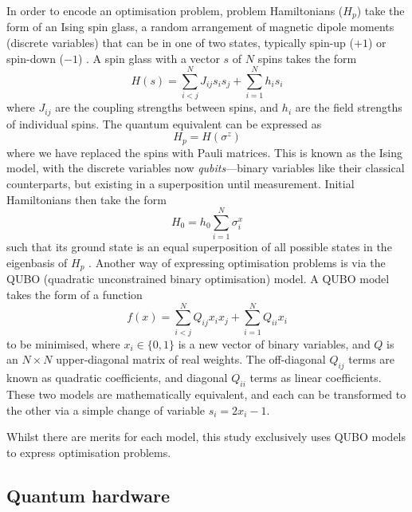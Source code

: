 \documentclass[twocolumn]{article}
\theoremstyle{definition}
\begin{document}
In order to encode an optimisation problem, problem Hamiltonians ($H_p$) take the form of an Ising spin glass, a random arrangement of magnetic dipole moments (discrete variables) that can be in one of two states, typically spin-up ($+1$) or spin-down ($-1$) \cite{lucas_ising_2014}. A spin glass with a vector $s$ of $N$ spins takes the form
\begin{equation}
    H(s) = \sum_{i<j}^{N}J_{ij}s_i s_j + \sum_{i=1}^{N}h_i s_i
    \label{eq:ising}
\end{equation}
where $J_{ij}$ are the coupling strengths between spins, and $h_i$ are the field strengths of individual spins. The quantum equivalent can be expressed as
\begin{equation}
    H_p = H(\sigma^z)
\end{equation}
where we have replaced the spins with Pauli matrices. This is known as the Ising model, with the discrete variables now \emph{qubits}---binary variables like their classical counterparts, but existing in a superposition until measurement. Initial Hamiltonians then take the form
\begin{equation}
    H_0 = h_0\sum_{i=1}^{N}\sigma_i^x
\end{equation}
such that its ground state is an equal superposition of all possible states in the eigenbasis of $H_p$ \cite{boixo_experimental_2013}.
Another way of expressing optimisation problems is via the QUBO (quadratic unconstrained binary optimisation) model. A QUBO model takes the form of a function
\begin{equation}
    f(x)=\sum^N_{i<j}Q_{ij}x_ix_j + \sum^N_{i=1}Q_{ii}x_i
    \label{eq:qubo}
\end{equation}
to be minimised, where $x_i\in\{0,1\}$ is a new vector of binary variables, and $Q$ is an $N\times N$ upper-diagonal matrix of real weights. The off-diagonal $Q_{ij}$ terms are known as quadratic coefficients, and diagonal $Q_{ii}$ terms as linear coefficients. These two models are mathematically equivalent, and each can be transformed to the other via a simple change of variable ${s_i = 2x_i - 1}$.

Whilst there are merits for each model, this study exclusively uses QUBO models to express optimisation problems.

\subsection{Quantum hardware}
\end{document}
